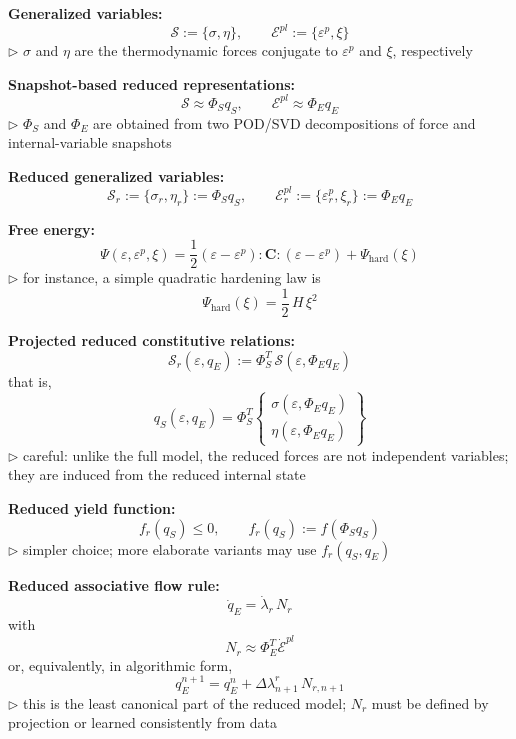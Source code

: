 \documentclass[11pt,a4paper]{article}
\begin{document}
\begin{algorithmic}[1]

\State \textbf{Generalized variables:}
\[
\mathcal S := \{\sigma,\eta\},
\qquad
\mathcal E^{pl} := \{\varepsilon^p,\xi\}
\]
\Statex \hspace{\algorithmicindent}
$\triangleright$ $\sigma$ and $\eta$ are the thermodynamic forces conjugate to
$\varepsilon^p$ and $\xi$, respectively

\State \textbf{Snapshot-based reduced representations:}
\[
\mathcal S \approx \Phi_S q_S,
\qquad
\mathcal E^{pl} \approx \Phi_E q_E
\]
\Statex \hspace{\algorithmicindent}
$\triangleright$ $\Phi_S$ and $\Phi_E$ are obtained from two POD/SVD decompositions of force and internal-variable snapshots

\State \textbf{Reduced generalized variables:}
\[
\mathcal S_r := \{\sigma_r,\eta_r\} := \Phi_S q_S,
\qquad
\mathcal E_r^{pl} := \{\varepsilon_r^p,\xi_r\} := \Phi_E q_E
\]

\State \textbf{Free energy:}
\[
\Psi(\varepsilon,\varepsilon^p,\xi)
=
\frac12 (\varepsilon-\varepsilon^p):\mathbf C:(\varepsilon-\varepsilon^p)
+
\Psi_{\mathrm{hard}}(\xi)
\]
\Statex \hspace{\algorithmicindent}
$\triangleright$ for instance, a simple quadratic hardening law is
\[
\Psi_{\mathrm{hard}}(\xi)=\frac12\,H\,\xi^2
\]

\State \textbf{Projected reduced constitutive relations:}
\[
\mathcal S_r(\varepsilon,q_E)
:=
\Phi_S^T\,\mathcal S(\varepsilon,\Phi_E q_E)
\]
that is,
\[
q_S(\varepsilon,q_E)
=
\Phi_S^T
\begin{Bmatrix}
\sigma(\varepsilon,\Phi_E q_E) \\
\eta(\varepsilon,\Phi_E q_E)
\end{Bmatrix}
\]
\Statex \hspace{\algorithmicindent}
$\triangleright$ careful: unlike the full model, the reduced forces are not independent variables; they are induced from the reduced internal state

\State \textbf{Reduced yield function:}
\[
f_r(q_S)\le 0,
\qquad
f_r(q_S):=f(\Phi_S q_S)
\]
\Statex \hspace{\algorithmicindent}
$\triangleright$ simpler choice; more elaborate variants may use $f_r(q_S,q_E)$

\State \textbf{Reduced associative flow rule:}
\[
\dot q_E
=
\dot\lambda_r\,N_r
\]
with
\[
N_r \approx \Phi_E^T \dot{\mathcal E}^{pl}
\]
or, equivalently, in algorithmic form,
\[
q_E^{n+1}=q_E^n+\Delta\lambda_{n+1}^r\,N_{r,n+1}
\]
\Statex \hspace{\algorithmicindent}
$\triangleright$ this is the least canonical part of the reduced model; $N_r$ must be defined by projection or learned consistently from data


\end{algorithmic}
\end{document}

